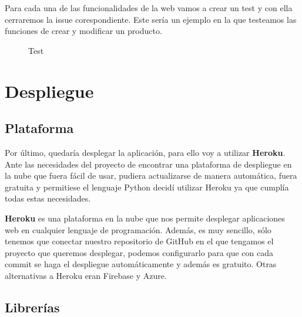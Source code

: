 Para cada una de las funcionalidades de la web vamos a crear un test y con ella cerraremos la issue corespondiente.
Este sería un ejemplo en la que testeamos las funciones de crear y modificar un producto.

\begin{figure}[H]
  \centering
  \noindent{}
  \caption{Test}
\end{figure}

\section{Despliegue} \label{sec:despliegue}

\subsection{Plataforma}

Por último, quedaría desplegar la aplicación, para ello voy a utilizar \textbf{Heroku}.\\

Ante las necesidades del proyecto de encontrar una plataforma de despliegue en la nube que fuera fácil de usar, pudiera actualizarse de manera automática, fuera gratuita y permitiese el lenguaje Python decidí utilizar Heroku ya que cumplía todas estas necesidades. 

\textbf{Heroku} es una plataforma en la nube que nos permite desplegar aplicaciones web en cualquier lenguaje de programación.
Además, es muy sencillo, sólo tenemos que conectar nuestro repositorio de GitHub en el que tengamos el proyecto que queremos desplegar,
podemos configurarlo para que con cada commit se haga el despliegue automáticamente y además es gratuito. Otras alternativas a Heroku 
eran Firebase y Azure.

\subsection{Librerías}

